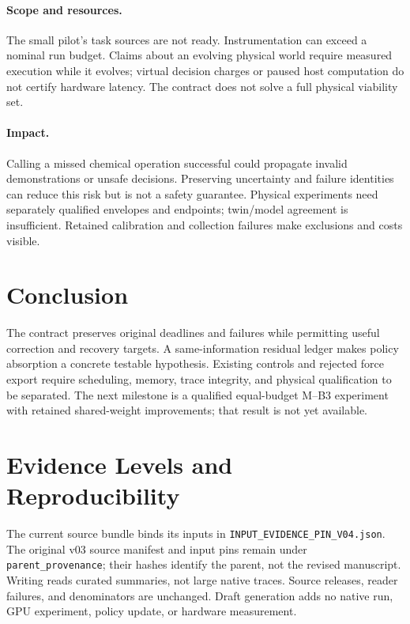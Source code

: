 \documentclass{article}
\begin{document}
\paragraph{Scope and resources.}
The small pilot's task sources are not ready. Instrumentation can exceed a nominal run budget. Claims about an evolving physical world require measured execution while it evolves; virtual decision charges or paused host computation do not certify hardware latency. The contract does not solve a full physical viability set.

\paragraph{Impact.}
Calling a missed chemical operation successful could propagate invalid demonstrations or unsafe decisions. Preserving uncertainty and failure identities can reduce this risk but is not a safety guarantee. Physical experiments need separately qualified envelopes and endpoints; twin/model agreement is insufficient. Retained calibration and collection failures make exclusions and costs visible.

\section{Conclusion}
The contract preserves original deadlines and failures while permitting useful correction and recovery targets. A same-information residual ledger makes policy absorption a concrete testable hypothesis. Existing controls and rejected force export require scheduling, memory, trace integrity, and physical qualification to be separated. The next milestone is a qualified equal-budget M--B3 experiment with retained shared-weight improvements; that result is not yet available.

\clearpage
\clearpage\appendix\onecolumn
\section{Evidence Levels and Reproducibility}
The current source bundle binds its inputs in \texttt{INPUT\_EVIDENCE\_PIN\_V04.json}. The original v03 source manifest and input pins remain under \texttt{parent\_provenance}; their hashes identify the parent, not the revised manuscript. Writing reads curated summaries, not large native traces. Source releases, reader failures, and denominators are unchanged. Draft generation adds no native run, GPU experiment, policy update, or hardware measurement.
\end{document}
